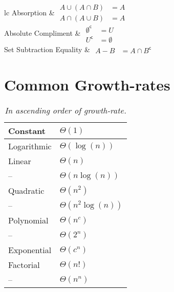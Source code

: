 \documentclass[main.tex]{subfiles}
\begin{document}
\begin{table}[h]
\begin{tabular}{lc}
		\midrule
		Absorption & \(\begin{aligned} A \cup (A \cap B) &= A \\ A \cap (A \cup B) &= A \end{aligned}\) \\
		\midrule
		Absolute Compliment & \(\begin{aligned} \emptyset^{\mathsf{c}} &= U \\ U^{\mathsf{c}} &= \emptyset \end{aligned}\) \\
		\midrule
		Set Subtraction Equality & \(\begin{aligned} A - B &= A \cap B^{\mathsf{c}} \end{aligned}\) \\
		\bottomrule
	\end{tabular}
\end{table}
\pagebreak

\section{Common Growth-rates}

\begin{table}[h]
	\centering
	\begin{tabular}{ll}
		\toprule
		Constant & \(\Theta(1)\) \\
		\midrule
		Logarithmic & \(\Theta(\log(n))\) \\
		\midrule
		Linear & \(\Theta(n)\) \\
		\midrule
		-- & \(\Theta(n\log(n))\) \\
		\midrule
		Quadratic & \(\Theta(n^2)\) \\
		\midrule
		-- & \(\Theta(n^2\log(n))\) \\
		\midrule
		Polynomial & \(\Theta(n^c)\) \\
		\midrule
		-- & \(\Theta(2^n)\) \\
		\midrule
		Exponential & \(\Theta(c^n)\) \\
		\midrule
		Factorial & \(\Theta(n!)\) \\
		\midrule
		-- & \(\Theta(n^n)\) \\
		\bottomrule
	\end{tabular}
	\caption{\textit{In ascending order of growth-rate.}}
\end{table}

\end{document}
